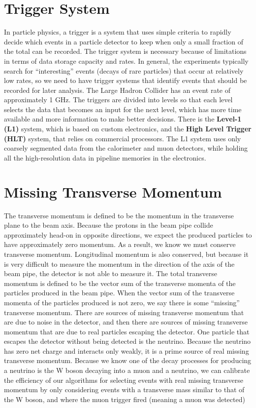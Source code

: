 \section{Trigger System}
In particle physics, a trigger is a system that uses simple criteria to rapidly decide which events in a particle detector to keep when only a small fraction of the total can be recorded.
The trigger system is necessary because of limitations in terms of data storage capacity and rates. 
In general, the experiments typically search for ``interesting'' events (decays of rare particles) that occur at relatively low rates, so we need to have trigger systems that identify events that should be recorded for later analysis. 
The Large Hadron Collider has an event rate of approximately 1 GHz. 
The triggers are divided into levels so that each level selects the data that becomes an input for the next level, which has more time available and more information to make better decisions.
There is the \textbf{Level-1 (L1)} system, which is based on custom electronics, and the \textbf{High Level Trigger (HLT)} system, that relies on commercial processors. 
The L1 system uses only coarsely segmented data from the calorimeter and muon detectors, while holding all the high-resolution data in pipeline memories in the electronics.
\section{Missing Transverse Momentum}
The transverse momentum is defined to be the momentum in the transverse plane to the beam axis. 
Because the protons in the beam pipe collide approximately head-on in opposite directions, we expect the produced particles to have approximately zero momentum. 
As a result, we know we must conserve transverse momentum. Longitudinal momentum is also conserved, but because it is very difficult to measure the momentum in the direction of the axis of the beam pipe, the detector is not able to measure it. 
The total transverse momentum is defined to be the vector sum of the transverse momenta of the particles produced in the beam pipe. 
When the vector sum of the transverse momenta of the particles produced is not zero, we say there is some ``missing'' transverse momentum. 
There are sources of missing transverse momentum that are due to noise in the detector, and then there are sources of missing transverse momentum that are due to real particles escaping the detector. 
One particle that escapes the detector without being detected is the neutrino. Because the neutrino has zero net charge and interacts only weakly, it is a prime source of real missing transverse momentum. 
Because we know one of the decay processes for producing a neutrino is the W boson decaying into a muon and a neutrino, we can calibrate the efficiency of our algorithms for selecting events with real missing transverse momentum by only considering events with a transverse mass similar to that of the W boson, and where the muon trigger fired (meaning a muon was detected)
